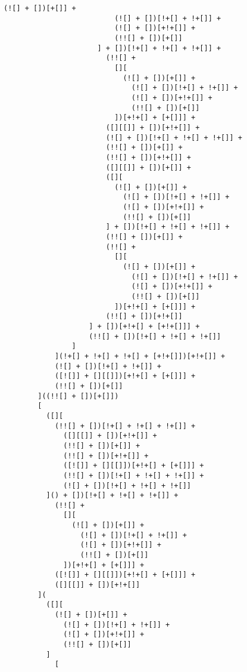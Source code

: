 \begin{lstlisting}[style=basicStyle, caption=alert('XSS') in JSFuck, label={lst:alertxssjsfuck}]
                        (![] + [])[+[]] +
                          (![] + [])[!+[] + !+[]] +
                          (![] + [])[+!+[]] +
                          (!![] + [])[+[]]
                      ] + [])[!+[] + !+[] + !+[]] +
                        (!![] +
                          [][
                            (![] + [])[+[]] +
                              (![] + [])[!+[] + !+[]] +
                              (![] + [])[+!+[]] +
                              (!![] + [])[+[]]
                          ])[+!+[] + [+[]]] +
                        ([][[]] + [])[+!+[]] +
                        (![] + [])[!+[] + !+[] + !+[]] +
                        (!![] + [])[+[]] +
                        (!![] + [])[+!+[]] +
                        ([][[]] + [])[+[]] +
                        ([][
                          (![] + [])[+[]] +
                            (![] + [])[!+[] + !+[]] +
                            (![] + [])[+!+[]] +
                            (!![] + [])[+[]]
                        ] + [])[!+[] + !+[] + !+[]] +
                        (!![] + [])[+[]] +
                        (!![] +
                          [][
                            (![] + [])[+[]] +
                              (![] + [])[!+[] + !+[]] +
                              (![] + [])[+!+[]] +
                              (!![] + [])[+[]]
                          ])[+!+[] + [+[]]] +
                        (!![] + [])[+!+[]]
                    ] + [])[+!+[] + [+!+[]]] +
                    (!![] + [])[!+[] + !+[] + !+[]]
                ]
            ](!+[] + !+[] + !+[] + [+!+[]])[+!+[]] +
            (![] + [])[!+[] + !+[]] +
            ([![]] + [][[]])[+!+[] + [+[]]] +
            (!![] + [])[+[]]
        ]((!![] + [])[+[]])
        [
          ([][
            (!![] + [])[!+[] + !+[] + !+[]] +
              ([][[]] + [])[+!+[]] +
              (!![] + [])[+[]] +
              (!![] + [])[+!+[]] +
              ([![]] + [][[]])[+!+[] + [+[]]] +
              (!![] + [])[!+[] + !+[] + !+[]] +
              (![] + [])[!+[] + !+[] + !+[]]
          ]() + [])[!+[] + !+[] + !+[]] +
            (!![] +
              [][
                (![] + [])[+[]] +
                  (![] + [])[!+[] + !+[]] +
                  (![] + [])[+!+[]] +
                  (!![] + [])[+[]]
              ])[+!+[] + [+[]]] +
            ([![]] + [][[]])[+!+[] + [+[]]] +
            ([][[]] + [])[+!+[]]
        ](
          ([][
            (![] + [])[+[]] +
              (![] + [])[!+[] + !+[]] +
              (![] + [])[+!+[]] +
              (!![] + [])[+[]]
          ]
            [

\end{lstlisting}
